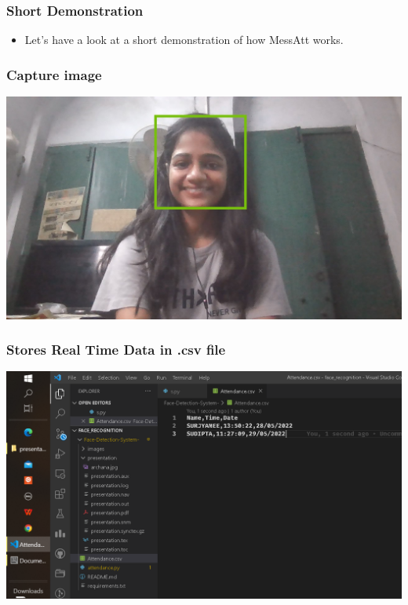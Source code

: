 \documentclass[12pt]{beamer}
\begin{document}
\begin{frame}
    \frametitle{Short Demonstration}
    \begin{itemize}          
        \item {Let's have a look at a short demonstration of how MessAtt works.}                    
    \end{itemize}       
\end{frame} 

\begin{frame}  
  \frametitle{Capture image}      
      \begin {center}
         \includegraphics[scale=0.24]{archana.jpg} 
      \end{center}   
\end{frame}  

\begin{frame}  
  \frametitle{Stores Real Time Data in .csv file}      
      \begin {center}
         \includegraphics[scale=0.34]{storeData.png} 
      \end{center}   
\end{frame}   
\end{document}
